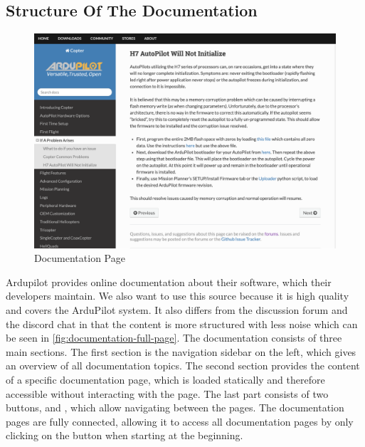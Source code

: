 \subsection{Structure Of The Documentation}\label{subsec:structure-of-the-documentation}
\begin{figure}
    \includegraphics[width=\textwidth]{figures/data_collection/documentation_full_page}
    \caption{Documentation Page}\label{fig:documentation-full-page}
\end{figure}

Ardupilot provides online documentation about their software, which their developers maintain.
We also want to use this source because it is high quality and covers the ArduPilot system.
It also differs from the discussion forum and the discord chat in that the content is more structured with less noise which can be seen in \autoref{fig:documentation-full-page}.
The documentation consists of three main sections.
The first section is the navigation sidebar on the left, which gives an overview of all documentation topics.
The second section provides the content of a specific documentation page, which is loaded statically and therefore accessible without interacting with the page.
The last part consists of two buttons,  and , which allow navigating between the pages.
The documentation pages are fully connected, allowing it to access all documentation pages by only clicking on the  button when starting at the beginning.

